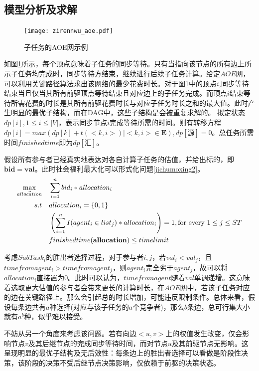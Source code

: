 \documentclass[promaster]{thesis-uestc}
\begin{document}
\subsection{模型分析及求解}
\begin{figure}[h]
\texttt{[image: zirennwu\_aoe.pdf]}
\caption{子任务的AOE网示例}
\label{zirennwu_aoe}
\end{figure}

如图\ref{zirennwu_aoe}所示，每个顶点意味着子任务的同步等待。只有当指向该节点的所有边上所示子任务均完成时，同步等待方结束，继续进行后续子任务计算。给定$AOE$网，可以利用关键路径算法求出该网络的最少花费时长。对于图\ref{zirennwu_aoe}中的顶点$i$,同步等待结束当且仅当其所有前驱顶点等待结束且对应边上的子任务完成。而顶点$i$结束等待所需花费的时长是其所有前驱花费时长与对应子任务时长之和的最大值。此时产生明显的最优子结构，而在DAG中，这些子结构是会被重复求解的。
拟定状态$dp[i],1 \leq i\leq |V|$，表示同步节点$i$完成等待所需的时间。则有转移方程$dp[i] = max(dp[k]+t(<k,i>)|<k,i> \in \mathbf{E}),dp[\text{源}] = 0$。总任务所需时间$finishedtime$即为$dp[\text{汇}]$。

假设所有参与者已经真实地表达对各自计算子任务的估值，并给出标的，即$\mathbf{bid}=\mathbf{val}$。此时社会福利最大化可以形式化问题\ref{jichumoxing2}。
\begin{align}
    \label{jichumoxing2}\max_{\vec{allocation}} \quad&\sum_{i=1}^{n}{bid_i*allocation_i}\\
    s.t                     \quad&allocation_i = \{0,1\}\notag\\
    \quad&\left(\sum_{i=1}^{n}{I(agent_i \in list_j)*allocation_i}\right) = 1,\text{for every }1 \leq j \leq ST\notag\\
    \quad&finishedtime(\mathbf{allocation}) \leq timelimit
    \notag
\end{align}

考虑$SubTask_i$的胜出者选择过程，对于参与者$i,j$，若$val_i < val_j$，且$timefromagent_i > timefromagent_j$，则$agent_i$完全劣于$agent_j$，故可以将$allocation_i$直接置为0。此时可以认为，$timefromagent$随着$val$单调递增。这意味着选取更大估值的参与者会带来更长的计算时长，在$AOE$网中，若该子任务对应的边在关键路径上。那么会引起总的时长增加，可能违反限制条件。总体来看，假设每条边共有$a$种选择(对应与该子任务的$a$个竞争者)，那么$b$条边，总可行集大小就有$a^b$种，似乎难以接受。

不妨从另一个角度来考虑该问题。若有向边$<u,v>$上的权值发生改变，仅会影响节点$v$及其后继节点的完成同步等待时间，而对节点$u$及其前驱节点无影响。这呈现明显的最优子结构及无后效性：每条边上的胜出者选择可以看做是阶段性决策，该阶段的决策不受后继节点决策影响，仅依赖于前驱的决策状态。
\end{document}
